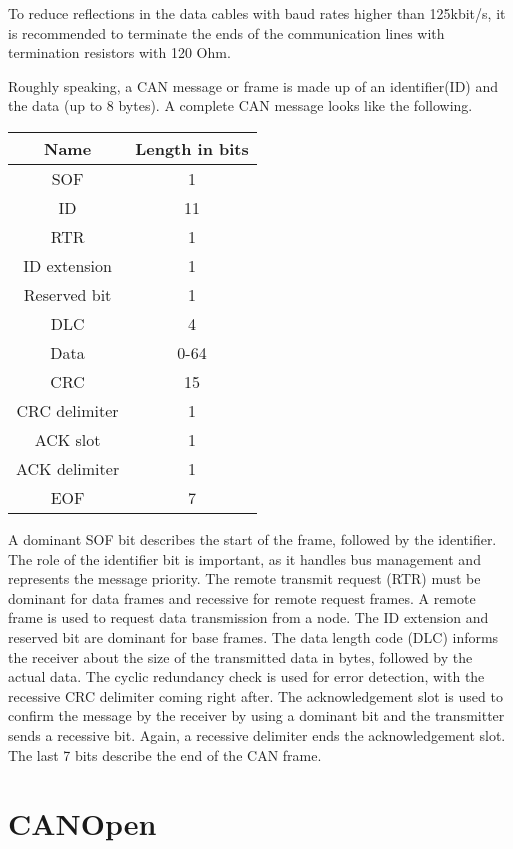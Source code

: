 To reduce reflections in the data cables with baud rates higher than 125kbit/s, it is recommended to terminate the ends of the communication lines with termination resistors with 120 Ohm. 

\newpage

Roughly speaking, a CAN message or frame is made up of an identifier(ID) and the data (up to 8 bytes). A complete CAN message looks like the following.

\begin{tabular}{|c|c|}
	\hline 
	\textbf{Name} & \textbf{Length in bits} \\ 
	\hline 
	SOF & 1 \\ 
	\hline 
	ID & 11 \\ 
	\hline 
	RTR & 1 \\ 
	\hline 
	ID extension & 1 \\ 
	\hline 
	Reserved bit & 1 \\ 
	\hline 
	DLC & 4 \\ 
	\hline 
	Data & 0-64 \\ 
	\hline 
	CRC & 15 \\ 
	\hline 
	CRC delimiter & 1 \\ 
	\hline 
	ACK slot & 1 \\ 
	\hline 
	ACK delimiter & 1 \\ 
	\hline 
	EOF & 7 \\ 
	\hline 
\end{tabular} 

A dominant SOF bit describes the start of the frame, followed by the identifier. The role of the identifier bit is important, as it handles bus management and represents the message priority. The remote transmit request (RTR) must be dominant for data frames and recessive for remote request frames. A remote frame is used to request data transmission from a node. The ID extension and reserved bit are dominant for base frames. The data length code (DLC) informs the receiver about the size of the transmitted data in bytes, followed by the actual data. The cyclic redundancy check is used for error detection, with the recessive CRC delimiter coming right after. The acknowledgement slot is used to confirm the message by the receiver by using a dominant bit and the transmitter sends a recessive bit. Again, a recessive delimiter ends the acknowledgement slot. The last 7 bits describe the end of the CAN frame.

\newpage

\section{CANOpen}

